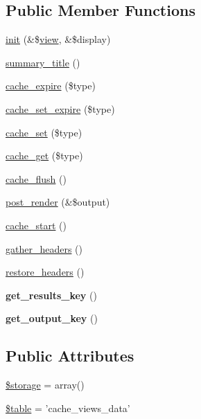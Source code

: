 \subsection*{Public Member Functions}
\begin{DoxyCompactItemize}
\item 
\hyperlink{classviews__plugin__cache_a6cecf3993f6314215559c6a914f8a96b}{init} (\&\$\hyperlink{classview}{view}, \&\$display)
\item 
\hyperlink{classviews__plugin__cache_a35e5232e39c8148476328e302787d16b}{summary\_\-title} ()
\item 
\hyperlink{classviews__plugin__cache_ababefa702965b1e9123a9cdc620f7d52}{cache\_\-expire} (\$type)
\item 
\hyperlink{classviews__plugin__cache_a1b96b0d016d91c5885592d3eaf1c8fca}{cache\_\-set\_\-expire} (\$type)
\item 
\hyperlink{classviews__plugin__cache_a4089f1652603b3e1012a8b0f00407c05}{cache\_\-set} (\$type)
\item 
\hyperlink{classviews__plugin__cache_a77d1ef6d62d4eb84209cf310194b173b}{cache\_\-get} (\$type)
\item 
\hyperlink{classviews__plugin__cache_a412bdc7ee43c6c26903d22b636ea96c8}{cache\_\-flush} ()
\item 
\hyperlink{classviews__plugin__cache_aac0aacd51f591fd161fb5fb1d735e3a8}{post\_\-render} (\&\$output)
\item 
\hyperlink{classviews__plugin__cache_aa59c91a728401e1a49857346ae665ce7}{cache\_\-start} ()
\item 
\hyperlink{classviews__plugin__cache_a557cef7540eec7d0a6ad9cd030724ef7}{gather\_\-headers} ()
\item 
\hyperlink{classviews__plugin__cache_a950552f19c93dc2132e73acc4c9198ac}{restore\_\-headers} ()
\item 
\hypertarget{classviews__plugin__cache_a91e1e17b18f19de9efb5365a78bd9585}{
{\bfseries get\_\-results\_\-key} ()}
\label{classviews__plugin__cache_a91e1e17b18f19de9efb5365a78bd9585}

\item 
\hypertarget{classviews__plugin__cache_a2c3ae60daf3a17787b37f1266a329135}{
{\bfseries get\_\-output\_\-key} ()}
\label{classviews__plugin__cache_a2c3ae60daf3a17787b37f1266a329135}

\end{DoxyCompactItemize}
\subsection*{Public Attributes}
\begin{DoxyCompactItemize}
\item 
\hyperlink{classviews__plugin__cache_adedb6ce98b20d56856176eb732887c89}{\$storage} = array()
\item 
\hyperlink{classviews__plugin__cache_ab87d5a0d212d539d19825a26e88fc070}{\$table} = 'cache\_\-views\_\-data'
\end{DoxyCompactItemize}


